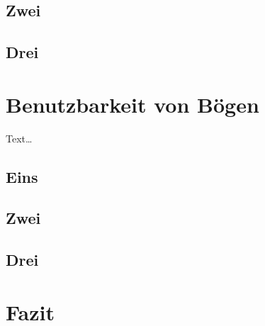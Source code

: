 \documentclass[11pt,a4paper]{report}
\begin{document}
\section{Zwei}

\blindtext[3]
\blindtext[1]
\blindtext[3]
\blindtext[4]
\blindtext[1]

\section{Drei}

\blindtext[2]
\blindtext[3]
\blindtext[2]
\blindtext[4]

\chapter{Benutzbarkeit von Bögen} \label{chap:bow}

Text\ldots

\section{Eins}

\blindtext[1]
\blindtext[2]
\blindtext[3]
\blindtext[2]
\blindtext[1]

\section{Zwei}

\blindtext[2]
\blindtext[2]
\blindtext[3]
\blindtext[2]

\section{Drei}

\blindtext[3]
\blindtext[5]
\blindtext[3]
\blindtext[2]


\chapter{Fazit} \label{chap:fazit}

\blindtext[2]
\blindtext[1]


\newpage


\end{document}
